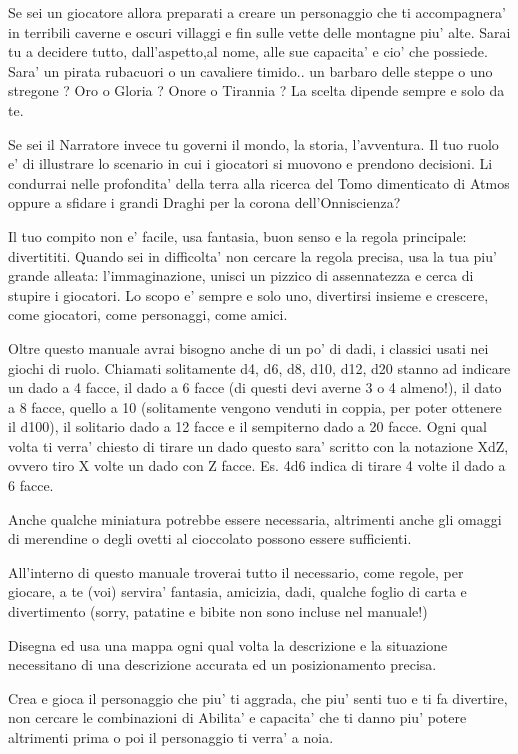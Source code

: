 \documentclass[a4paper,11pt,twoside,openany]{dndbook}
\begin{document}
Se sei un giocatore allora preparati a creare un personaggio che ti accompagnera' in terribili caverne e oscuri villaggi e fin sulle vette delle montagne piu' alte. Sarai tu a decidere tutto, dall'aspetto,al nome, alle sue capacita' e cio' che possiede. Sara' un pirata rubacuori o un cavaliere timido.. un barbaro delle steppe o uno stregone ? Oro o Gloria ? Onore o Tirannia ? La scelta dipende sempre e solo da te.

Se sei il Narratore invece tu governi il mondo, la storia, l'avventura. Il tuo ruolo e' di illustrare lo scenario in cui i giocatori si muovono e prendono decisioni. Li condurrai nelle profondita' della terra alla ricerca del Tomo dimenticato di Atmos oppure a sfidare i grandi Draghi per la corona dell'Onniscienza?

Il tuo compito non e' facile, usa fantasia, buon senso e la regola principale: divertititi. Quando sei in difficolta' non cercare la regola precisa, usa la tua piu' grande alleata: l'immaginazione, unisci un pizzico di assennatezza e cerca di stupire i giocatori. Lo scopo e' sempre e solo uno, divertirsi insieme e crescere, come giocatori, come personaggi, come amici.

Oltre questo manuale avrai bisogno anche di un po' di dadi, i classici usati nei giochi di ruolo.
Chiamati solitamente d4, d6, d8, d10, d12, d20 stanno ad indicare un dado a 4 facce, il dado a 6 facce (di questi devi averne 3 o 4 almeno!), il dato a 8 facce, quello a 10 (solitamente vengono venduti in coppia, per poter ottenere il d100), il solitario dado a 12 facce e il sempiterno dado a 20 facce.
Ogni qual volta ti verra' chiesto di tirare un dado questo sara' scritto con la notazione XdZ, ovvero tiro X volte un dado con Z facce. Es. 4d6 indica di tirare 4 volte il dado a 6 facce.

Anche qualche miniatura potrebbe essere necessaria, altrimenti anche gli omaggi di merendine o degli ovetti al cioccolato possono essere sufficienti.

All'interno di questo manuale troverai tutto il necessario, come regole, per giocare, a te (voi) servira' fantasia, amicizia, dadi, qualche foglio di carta e divertimento (sorry, patatine e bibite non sono incluse nel manuale!)

Disegna ed usa una mappa ogni qual volta la descrizione e la situazione necessitano di una descrizione accurata ed un posizionamento precisa. 

Crea e gioca il personaggio che piu' ti aggrada, che piu' senti tuo e ti fa divertire, non cercare le combinazioni di Abilita' e capacita' che ti danno piu' potere altrimenti prima o poi il personaggio ti verra' a noia.
\end{document}
